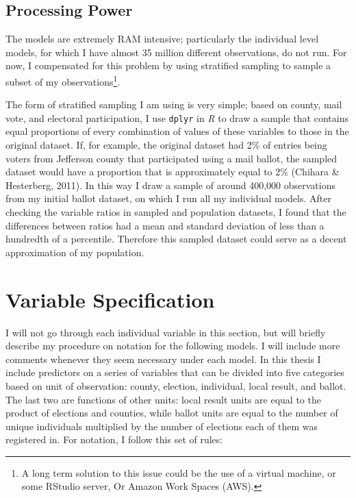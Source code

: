 \documentclass[12pt,twoside]{reedthesis}
\begin{document}
  \subsection{Processing Power}\label{processing-power}
  
  The models are extremely RAM intensive; particularly the individual
  level models, for which I have almost 35 million different observations,
  do not run. For now, I compensated for this problem by using stratified
  sampling to sample a subset of my observations\footnote{A long term
    solution to this issue could be the use of a virtual machine, or some
    RStudio server, Or Amazon Work Spaces (AWS).}.
  
  The form of stratified sampling I am using is very simple; based on
  county, mail vote, and electoral participation, I use \texttt{dplyr} in
  \textit{R} to draw a sample that contains equal proportions of every
  combination of values of these variables to those in the original
  dataset. If, for example, the original dataset had 2\% of entries being
  voters from Jefferson county that participated using a mail ballot, the
  sampled dataset would have a proportion that is approximately equal to
  2\% (Chihara \& Hesterberg, 2011). In this way I draw a sample of around
  400,000 observations from my initial ballot dataset, on which I run all
  my individual models. After checking the variable ratios in sampled and
  population datasets, I found that the differences between ratios had a
  mean and standard deviation of less than a hundredth of a percentile.
  Therefore this sampled dataset could serve as a decent approximation of
  my population.
  
  \section{Variable Specification}\label{variable-specification}
  
  I will not go through each individual variable in this section, but will
  briefly describe my procedure on notation for the following models. I
  will include more comments whenever they seem necessary under each
  model. In this thesis I include predictors on a series of variables that
  can be divided into five categories based on unit of observation:
  county, election, individual, local result, and ballot. The last two are
  functions of other units: local result units are equal to the product of
  elections and counties, while ballot units are equal to the number of
  unique individuals multiplied by the number of elections each of them
  was registered in. For notation, I follow this set of rules:
  
\end{document}
